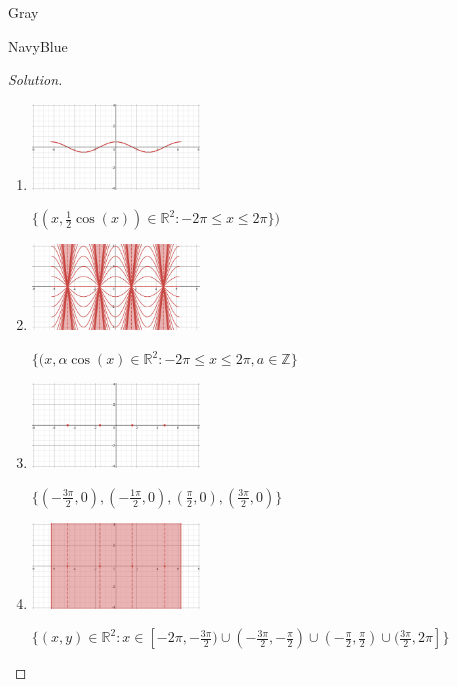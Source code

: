 \documentclass[12pt]{amsart}
\theoremstyle{named}
\newenvironment{soln}
{\begin{color}{Gray}\begin{framed}\begin{color}{NavyBlue}\begin{proof}[Solution]
\doublespacing}
{\end{proof}\end{color}\end{framed}\end{color}}
\theoremstyle{definition}
\begin{document}
\begin{soln}
	\phantom{ }

	\begin{enumerate}
		\item \phantom{ }
		
		\includegraphics[width=12em]{media/3.1.png}

		$\{(x,\frac{1}{2}\cos(x))\in \mathbb R^2:-2\pi \leq x \leq 2\pi\})$
	
		\item \phantom{ }
		
		\includegraphics[width=12em]{media/3.2.png}

		$\{(x,\alpha\cos(x)\in\mathbb R^2: -2\pi \leq x \leq 2\pi,a\in\mathbb Z\}$

		\item \phantom{ }
		
		\includegraphics[width=12em]{media/3.3-3.5.png}

		$\{(-\frac{3\pi}{2},0),(-\frac{1\pi}{2},0),(\frac{\pi}{2},0),(\frac{3\pi}{2},0)\}$
	
		\phantom{ }

		\phantom{ }

		\phantom{ }

		\item \phantom{ }
		
		\includegraphics[width=12em]{media/3.4.png}

		$\{(x,y)\in\mathbb R^2: x \in [-2\pi,-\frac{3\pi}{2}) \cup (-\frac{3\pi}{2},-\frac{\pi}{2}) \cup (-\frac{\pi}{2},\frac{\pi}{2}) \cup (\frac{3\pi}{2},2\pi]\}$
		

\end{enumerate}
\end{soln}
\end{document}

